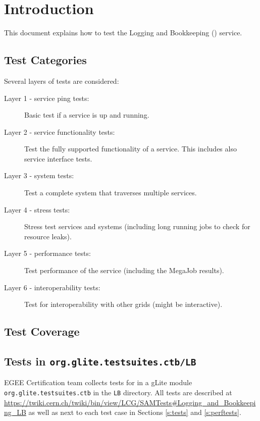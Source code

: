 \section{Introduction}

This document explains how to test the Logging and Bookkeeping (\LB) service. 



\subsection{Test Categories}
Several layers of tests are considered:

\begin{description}
\item[Layer 1 - service ping tests:] Basic test if a service is up and running.
\item[Layer 2 - service functionality tests:] Test the fully supported functionality of a service. This includes also service interface tests.
\item[Layer 3 - system tests:] Test a complete system that traverses multiple services.
\item[Layer 4 - stress tests:] Stress test services and systems (including long running jobs to check for resource leaks).
\item[Layer 5 - performance tests:] Test performance of the service (including the MegaJob results).
\item[Layer 6 - interoperability tests:] Test for interoperability with other grids (might be interactive).
\end{description}


\subsection{Test Coverage}


\subsection{Tests in \texttt{org.glite.testsuites.ctb/LB}}

EGEE Certification team collects tests for \LB in a gLite module
\verb'org.glite.testsuites.ctb' in the \verb'LB' directory. All \LB tests are
described at
\url{https://twiki.cern.ch/twiki/bin/view/LCG/SAMTests#Logging_and_Bookkeeping_LB}
as well as next to each test case in Sections \ref{s:tests} and \ref{s:perftests}.

